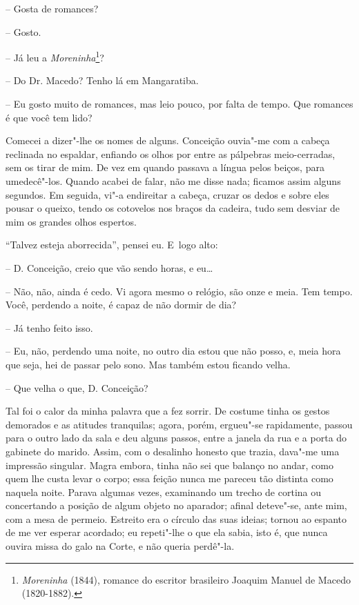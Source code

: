 -- Gosta de romances?

-- Gosto.

-- Já leu a \emph{Moreninha}\footnote{\emph{Moreninha} (1844), romance
  do escritor brasileiro Joaquim Manuel de Macedo (1820-1882).}?

-- Do Dr. Macedo? Tenho lá em Mangaratiba.

-- Eu gosto muito de romances, mas leio pouco, por falta de tempo. Que
romances é que você tem lido?

Comecei a dizer"-lhe os nomes de alguns. Conceição ouvia"-me com a cabeça
reclinada no espaldar, enfiando os olhos por entre as pálpebras
meio-cerradas, sem os tirar de mim. De vez em quando passava a língua
pelos beiços, para umedecê"-los. Quando acabei de falar, não me disse
nada; ficamos assim alguns segundos. Em seguida, vi"-a endireitar a
cabeça, cruzar os dedos e sobre eles pousar o queixo, tendo os cotovelos
nos braços da cadeira, tudo sem desviar de mim os grandes olhos
espertos.

``Talvez esteja aborrecida'', pensei eu. E~logo alto:

-- D. Conceição, creio que vão sendo horas, e eu\ldots{}

-- Não, não, ainda é cedo. Vi agora mesmo o relógio, são onze e meia.
Tem tempo. Você, perdendo a noite, é capaz de não dormir de dia?

-- Já tenho feito isso.

-- Eu, não, perdendo uma noite, no outro dia estou que não posso, e,
meia hora que seja, hei de passar pelo sono. Mas também estou ficando
velha.

-- Que velha o que, D. Conceição?

Tal foi o calor da minha palavra que a fez sorrir. De costume tinha os
gestos demorados e as atitudes tranquilas; agora, porém, ergueu"-se
rapidamente, passou para o outro lado da sala e deu alguns passos, entre
a janela da rua e a porta do gabinete do marido. Assim, com o desalinho
honesto que trazia, dava"-me uma impressão singular. Magra embora, tinha
não sei que balanço no andar, como quem lhe custa levar o corpo; essa
feição nunca me pareceu tão distinta como naquela noite. Parava algumas
vezes, examinando um trecho de cortina ou concertando a posição de algum
objeto no aparador; afinal deteve"-se, ante mim, com a mesa de permeio.
Estreito era o círculo das suas ideias; tornou ao espanto de me ver
esperar acordado; eu repeti"-lhe o que ela sabia, isto é, que nunca
ouvira missa do galo na Corte, e não queria perdê"-la.

